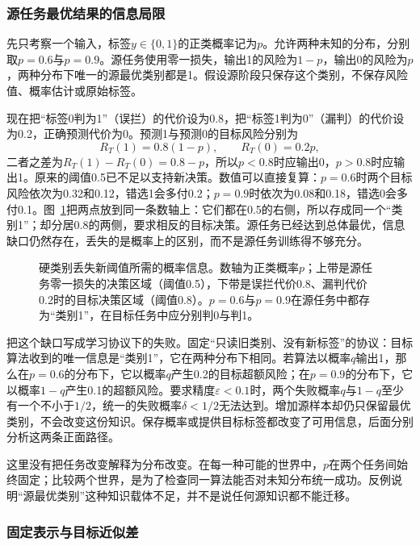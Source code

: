 \subsubsection{源任务最优结果的信息局限}
\label{sec:task-hard-label-limit}

先只考察一个输入，标签$y\in\{0,1\}$的正类概率记为$p$。允许两种未知的分布，分别取$p=0.6$与$p=0.9$。源任务使用零一损失，输出1的风险为$1-p$，输出0的风险为$p$，两种分布下唯一的源最优类别都是1。假设源阶段只保存这个类别，不保存风险值、概率估计或原始标签。

现在把“标签0判为1”（误拦）的代价设为0.8，把“标签1判为0”（漏判）的代价设为0.2，正确预测代价为0。预测1与预测0的目标风险分别为
\[
 R_T(1)=0.8(1-p),\qquad R_T(0)=0.2p ,
\]
二者之差为$R_T(1)-R_T(0)=0.8-p$，所以$p<0.8$时应输出0，$p>0.8$时应输出1。原来的阈值0.5已不足以支持新决策。数值可以直接复算：$p=0.6$时两个目标风险依次为0.32和0.12，错选1会多付0.2；$p=0.9$时依次为0.08和0.18，错选0会多付0.1。图~\ref{fig:lt9-hard-label-threshold}把两点放到同一条数轴上：它们都在0.5的右侧，所以存成同一个“类别1”；却分居0.8的两侧，要求相反的目标决策。源任务已经达到总体最优，信息缺口仍然存在，丢失的是概率上的区别，而不是源任务训练得不够充分。

\begin{figure}[htbp]
 \centering
 
 \caption{硬类别丢失新阈值所需的概率信息。数轴为正类概率$p$；上带是源任务零一损失的决策区域（阈值0.5），下带是误拦代价0.8、漏判代价0.2时的目标决策区域（阈值0.8）。$p=0.6$与$p=0.9$在源任务中都存为“类别1”，在目标任务中应分别判0与判1。}
 \label{fig:lt9-hard-label-threshold}
\end{figure}

把这个缺口写成学习协议下的失败。固定“只读旧类别、没有新标签”的协议：目标算法收到的唯一信息是“类别1”，它在两种分布下相同。若算法以概率$q$输出1，那么在$p=0.6$的分布下，它以概率$q$产生0.2的目标超额风险；在$p=0.9$的分布下，它以概率$1-q$产生0.1的超额风险。要求精度$\varepsilon<0.1$时，两个失败概率$q$与$1-q$至少有一个不小于$1/2$，统一的失败概率$\delta<1/2$无法达到。增加源样本却仍只保留最优类别，不会改变这份知识。保存概率或提供目标标签都改变了可用信息，后面分别分析这两条正面路径。

这里没有把任务改变解释为分布改变。在每一种可能的世界中，$p$在两个任务间始终固定；比较两个世界，是为了检查同一算法能否对未知分布统一成功。反例说明“源最优类别”这种知识载体不足，并不是说任何源知识都不能迁移。

\subsubsection{固定表示与目标近似差}
\label{sec:task-representation-gap}

